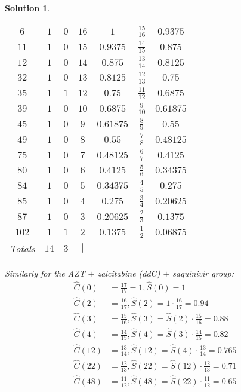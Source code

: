 \documentclass[11pt]{article}
\newtheorem{sol}{Solution}
\begin{document}
\begin{sol}
\begin{center}
\begin{tabular}{ccccccc}
		$6$& $1$ & $0$ & $16$& $1$ & $\frac{15}{16}$ & $0.9375$\\
		$11$ & $1$ & $0$ & $15$ & $0.9375$ & $\frac{14}{15}$ & $0.875$\\
		$12$ & $1$ & $0$ & $14$ & $0.875$ & $\frac{13}{14}$ & $0.8125$\\
		$32$ & $1$ & $0$ & $13$ & $0.8125$ & $\frac{12}{13}$ & $0.75$\\
		$35$ & $1$ & $1$ & $12$ & $0.75$ & $\frac{11}{12}$ & $0.6875$\\
		$39$ & $1$ & $0$ & $10$ & $0.6875$ & $\frac{9}{10}$ & $0.61875$\\
		$45$ & $1$ & $0$ & $9$ & $0.61875$ & $\frac{8}{9}$ & $0.55$\\
		$49$ & $1$ & $0$ & $8$ & $0.55$ & $\frac{7}{8}$ & $0.48125$\\
		$75$ & $1$ & $0$ & $7$ & $0.48125$ & $\frac{6}{7} $ & $0.4125$\\
		$80$ & $1$ & $0$ & $6$ & $0.4125$ & $\frac{5}{6}$& $0.34375$\\
		$84$ & $1$ & $0$ & $5$ & $0.34375$ & $\frac{4}{5}$& $0.275$\\
		$85$ & $1$ & $0$ & $4$ & $0.275$& $\frac{3}{4}$ & $0.20625$\\
		$87$ & $1$ & $0$ & $3$ & $0.20625$ & $\frac{2}{3}$ & $0.1375$\\
		$102$ & $1$ & $1$ & $2$ & $0.1375$ & $\frac{1}{2}$ & $0.06875$\\
		Totals& $14$ & $3$ & $|$ &&&\\
	\end{tabular}
	\end{center}
	Similarly for the AZT $+$ zalcitabine (ddC) $+$ saquinivir group:\vskip 2mm
	\begin{align*}
		\hat{C}(0) &= \frac{17}{17} = 1, \hat{S}(0) = 1\\
		\hat{C}(2) &= \frac{16}{17}, \hat{S}(2) = 1\cdot \frac{16}{17} = 0.94\\
		\hat{C}(3) &= \frac{15}{16}, \hat{S}(3) = \hat{S}(2)\cdot \frac{15}{16} = 0.88\\
		\hat{C}(4) &= \frac{14}{15}, \hat{S}(4) = \hat{S}(3) \cdot \frac{14}{15} = 0.82\\
		\hat{C}(12) &= \frac{13}{14}, \hat{S}(12) = \hat{S}(4)\cdot \frac{13}{14} = 0.765\\
		\hat{C}(22) &= \frac{12}{13}, \hat{S}(22) = \hat{S}(12)\cdot \frac{12}{13} = 0.71\\
		\hat{C}(48) &= \frac{11}{12}, \hat{S}(48) = \hat{S}(22) \cdot \frac{11}{12} = 0.65\\

\end{align*}
\end{sol}
\end{document}

